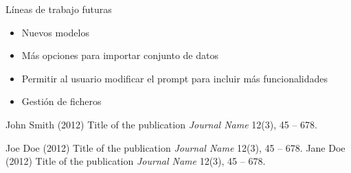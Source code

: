 \documentclass[aspectratio=169,xcolor=dvipsnames, t]{beamer}
\begin{document}
\begin{frame}{Líneas de trabajo futuras}
    \begin{itemize}
        \item Nuevos modelos
        \item Más opciones para importar conjunto de datos
        \item Permitir al usuario modificar el prompt para incluir más funcionalidades
        \item Gestión de ficheros
    \end{itemize}
\end{frame}

\begin{frame}{}
    \footnotesize{
        \begin{thebibliography}{99}
             John Smith (2012)
            \newblock Title of the publication
            \newblock \emph{Journal Name} 12(3), 45 -- 678.

             Joe Doe (2012)
            \newblock Title of the publication
            \newblock \emph{Journal Name} 12(3), 45 -- 678.
             Jane Doe (2012)
            \newblock Title of the publication
            \newblock \emph{Journal Name} 12(3), 45 -- 678.
        \end{thebibliography}
    }
\end{frame}

\makefinalpage
\end{document}
